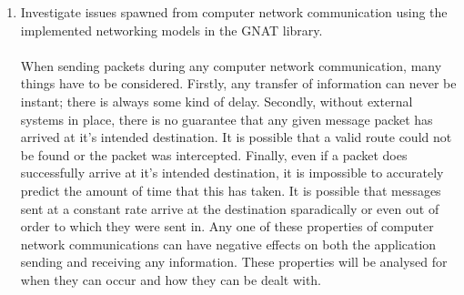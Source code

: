\begin{enumerate}
\item Investigate issues spawned from computer network communication using the implemented networking models in the GNAT library.
  \\\\
  When sending packets during any computer network communication, many things have to be considered. Firstly, any transfer of information can never be instant; there is always some kind of delay. Secondly, without external systems in place, there is no guarantee that any given message packet has arrived at it's intended destination. It is possible that a valid route could not be found or the packet was intercepted. Finally, even if a packet does successfully arrive at it's intended destination, it is impossible to accurately predict the amount of time that this has taken. It is possible that messages sent at a constant rate arrive at the destination sparadically or even out of order to which they were sent in.
  Any one of these properties of computer network communications can have negative effects on both the application sending and receiving any information. These properties will be analysed for when they can occur and how they can be dealt with.
\end{enumerate}


\newpage
